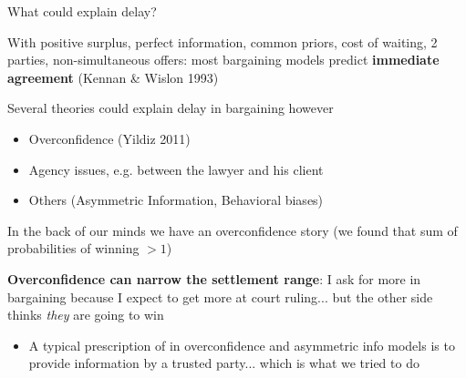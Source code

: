 \documentclass[9pt]{beamer}
\begin{document}
\begin{frame}{What could explain delay?}

With positive surplus, perfect information, common priors, cost of waiting, 2 parties, non-simultaneous offers:  most bargaining models predict \textbf{immediate agreement} (Kennan \& Wislon 1993)

\pause
\vspace{.2in}
Several theories could explain delay in bargaining however
    \begin{itemize}
        \item Overconfidence (Yildiz 2011)
        \item Agency issues, e.g. between the lawyer and his client
        \item Others (Asymmetric Information, Behavioral biases)
    \end{itemize}
\vspace{.1in}


In the back of our minds we have an overconfidence story (we found that sum of probabilities of winning $>1$)



\vspace{.15in}

\pause
\textbf{Overconfidence can narrow the settlement range}: I ask for more in bargaining because I expect to get more at court ruling... but the other side thinks \textit{they} are going to win


\begin{itemize}
    \item A typical prescription of in overconfidence and asymmetric info models is to provide information by a trusted party... which is what we tried to do
\end{itemize}


\end{frame}
\end{document}
